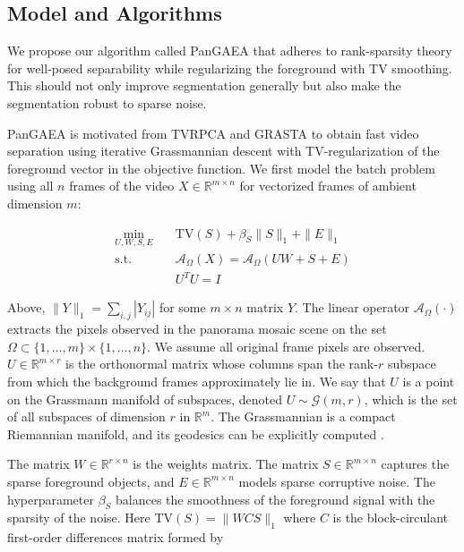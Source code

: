\documentclass[10pt,twocolumn,letterpaper]{article}
\begin{document}
\subsection{Model and Algorithms}

We propose our algorithm called PanGAEA that adheres to rank-sparsity theory for well-posed separability while regularizing the foreground with TV smoothing. This should not only improve segmentation generally but also make the segmentation robust to sparse noise.

PanGAEA is motivated from TVRPCA \cite{tv_rpca} and GRASTA \cite{grasta} to obtain fast video separation using iterative Grassmannian descent with TV-regularization of the foreground vector in the objective function. We first model the batch problem using all $n$ frames of the video $X \in \mathbb{R}^{m \times n}$ for vectorized frames of ambient dimension $m$:

\begin{equation}
    \begin{split}
        \min_{U, W, S, E} \quad &  \text{TV}(S) + \beta_S\|S\|_1 + \|E\|_1 \\
    \text{s.t. } & \mathcal{A}_\Omega (X) = \mathcal{A}_\Omega (UW + S + E) \\
    & U^T U = I 
    \end{split}
    \label{eq:pangaea_global}
\end{equation}

\noindent Above, $\|Y\|_1 = \sum_{i,j} |Y_{ij}|$ for some $m \times n$ matrix $Y$. The linear operator $\mathcal{A}_\Omega(\cdot)$ extracts the pixels observed in the panorama mosaic scene on the set $\Omega \subset \{1,\hdots,m\} \times \{1,\hdots, n\}$. We assume all original frame pixels are observed. $U \in \mathbb{R}^{m \times r}$ is the orthonormal matrix whose columns span the rank-$r$ subspace from which the background frames approximately lie in. We say that $U$ is a point on the Grassmann manifold of subspaces, denoted $U \sim \mathcal{G}(m,r)$, which is the set of all subspaces of dimension $r$ in $\mathbb{R}^{m}$. The Grassmannian is a compact Riemannian manifold, and its geodesics can be explicitly computed \cite{grouse}.

The matrix $W \in \mathbb{R}^{r \times n}$ is the weights matrix. The matrix $S \in \mathbb{R}^{m \times n}$ captures the sparse foreground objects, and $E \in \mathbb{R}^{m \times n}$ models sparse corruptive noise. The hyperparameter $\beta_S$ balances the smoothness of the foreground signal with the sparsity of the noise. Here $\text{TV}(S) = \|WCS\|_1$ where $C$ is the block-circulant first-order differences matrix formed by
\end{document}

